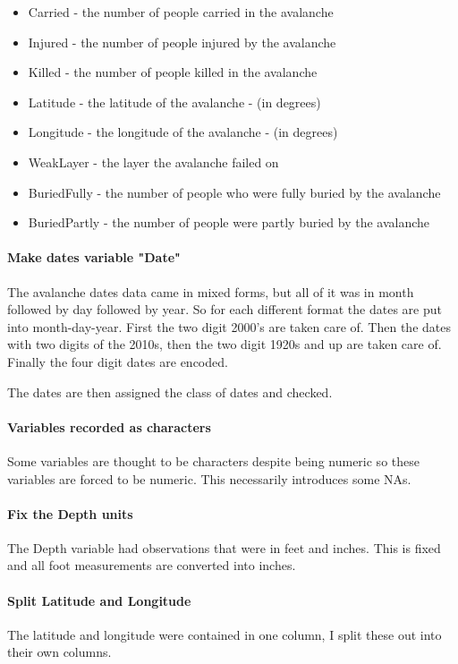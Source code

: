 \documentclass[12pt]{article}
\begin{document}
\begin{itemize}
\item Carried - the number of people carried in the avalanche
\item Injured - the number of people injured by the avalanche
\item Killed - the number of people killed in the avalanche
\item Latitude - the latitude of the avalanche - (in degrees)
\item Longitude - the longitude of the avalanche - (in degrees)
\item WeakLayer - the layer the avalanche failed on
\item BuriedFully - the number of people who were fully buried by the avalanche
\item BuriedPartly - the number of people were partly buried by the avalanche
\end{itemize}

\paragraph*{Make dates variable "Date"}
The avalanche dates data came in mixed forms, but all of it was in month followed by day followed by year.  So for each different format the dates are put into month-day-year.  First the two digit 2000's are taken care of.  Then the dates with two digits of the 2010s, then the two digit 1920s and up are taken care of.  Finally the four digit dates are encoded.

The dates are then assigned the class of dates and checked.


\paragraph*{Variables recorded as characters}
Some variables are thought to be characters despite being numeric so these variables are forced to be numeric.  This necessarily introduces some NAs.

\paragraph*{Fix the Depth units}
The Depth variable had observations that were in feet and inches.  This is fixed and all foot measurements are converted into inches.

\paragraph*{Split Latitude and Longitude}
The latitude and longitude were contained in one column, I split these out into their own columns.
\end{document}
